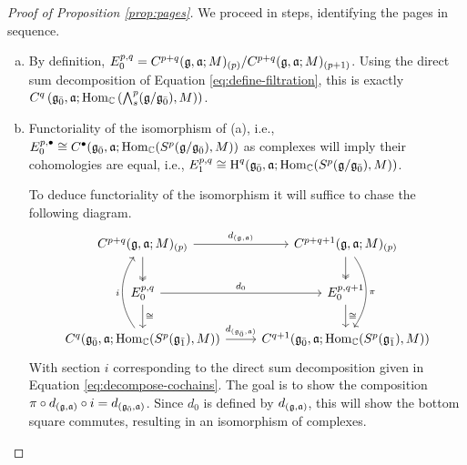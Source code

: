 \begin{proof}[Proof of Proposition \ref{prop:pages}]
    We proceed in steps, identifying the pages in sequence.
  \begin{enumerate}[(a)]
\item   By definition, $E_0^{p,q} = C^{p+q}(\mathfrak{g},\mathfrak{a};M)_{(p)}/C^{p+q}(\mathfrak{g},\mathfrak{a};M)_{(p+1)}$. Using the direct sum decomposition of Equation \ref{eq:define-filtration}, this is exactly $C^q\left({\mathfrak{g}}_{\bar{0}},\mathfrak{a};\operatorname{Hom}_{\mathbb{C}}\left(\bigwedge\nolimits^{p}_s(\mathfrak{g}/{\mathfrak{g}}_{\bar{0}}),M\right)\right)$.
\item Functoriality of the isomorphism of (a), i.e., $E_0^{p,\bullet} \cong C^\bullet({\mathfrak{g}}_{\bar{0}},\mathfrak{a};\operatorname{Hom}_{\mathbb{C}}(S^p(\mathfrak{g}/{\mathfrak{g}}_{\bar{0}}),M))$ as complexes will imply their cohomologies are equal, i.e.,  $E_1^{p,q} \cong \operatorname{H}^q({\mathfrak{g}}_{\bar{0}},\mathfrak{a};\operatorname{Hom}_{\mathbb{C}}(S^p(\mathfrak{g}/{\mathfrak{g}}_{\bar{0}}),M))$.

  To deduce functoriality of the isomorphism it will suffice to chase the following diagram.
    \[
    \begin{tikzcd}
      C^{p+q}(\g,\a;M)_{(p)} \arrow[r,"d_{(\g,\a)}"] \arrow[d,twoheadrightarrow] & C^{p+q+1}(\g,\a;M)_{(p)} \arrow[d,twoheadrightarrow] \arrow[dd,bend left=35,"\pi"] \\
      E_0^{p,q} \arrow[r,"d_0"] \arrow[d,"\cong"] & E_0^{p,q+1} \arrow[d,"\cong"] \\
      C^q(\even{\g},\a;\Hom_\CC(S^p(\odd{\g}),M)) \arrow[r,"d_{(\even{\g},\a)}"] \arrow[uu,bend left=35,"i"] & C^{q+1}(\even{\g},\a;\Hom_\CC(S^p(\odd{\g}),M))
    \end{tikzcd}
  \]
  With section $i$ corresponding to the direct sum decomposition given in Equation \ref{eq:decompose-cochains}. The goal is to show the composition $ \pi \circ d_{(\mathfrak{g},\mathfrak{a})}\circ i = d_{({\mathfrak{g}}_{\bar{0}},\mathfrak{a})}$. Since $d_0$ is defined by $d_{(\mathfrak{g},\mathfrak{a})}$, this will show the bottom square commutes, resulting in an isomorphism of complexes.


\end{enumerate}
\end{proof}
